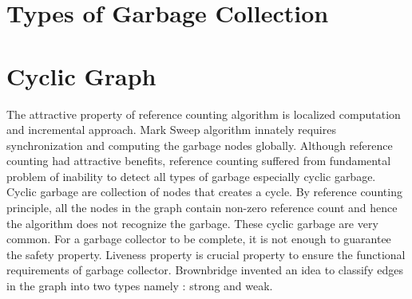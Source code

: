 \begin{comment}
Every block of memory that represents a data is generally referred as object in object oriented programming langauges. In this thesis, we abstract the environment into graph theoretic concepts. 
Every object allocated in the heap can be mapped in to nodes. Nodes are represent by circle in the graph. An object might contain references to other objects in the heaps. These references are unidirectional references. These references can be modeled as directed edges in the graph. So the nodes have arc followed by an arrow. The directional edge represent which objects stores the references. The arc ending with no arrow saves the references of the node with arrow. So the relationship among objects in the heap can be modeled in to nodes and edges. Roots in the stack memory and static memory can be modeled in to separate nodes or a single node. The unique property of the root node(s) (R) is/are they never contain an incoming edge. The roots are inaccesible by the objects in the heap or by other roots. So this creates a unique property among the nodes. So R only contains directional edges that points to other nodes. 
\end{comment}

\section{Types of Garbage Collection}

\section{Cyclic Graph}
The attractive property of reference counting algorithm is localized computation and incremental approach. Mark Sweep algorithm innately requires synchronization and computing the garbage nodes globally. Although reference counting had attractive benefits, reference counting  suffered from fundamental problem of inability to detect all types of garbage especially cyclic garbage. Cyclic garbage are collection of nodes that creates a cycle. By reference counting principle, all the nodes in the graph contain non-zero reference count and hence the algorithm does not recognize the garbage. These cyclic garbage are very common. For a garbage collector to be complete, it is not enough to guarantee the safety property. Liveness property is crucial property to ensure the functional requirements of garbage collector. Brownbridge invented an idea to classify edges in the graph into two types namely : strong and weak. 
